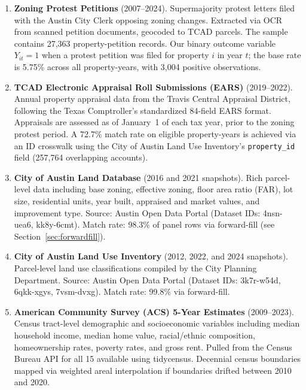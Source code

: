 \begin{enumerate}
    \item \textbf{Zoning Protest Petitions} (2007--2024). Supermajority protest letters filed
    with the Austin City Clerk opposing zoning changes.
    Extracted via OCR from scanned petition documents, geocoded to TCAD parcels.
    The sample contains 27,363 property-petition records. Our binary outcome variable
    $Y_{it} = 1$ when a protest petition was filed for property $i$ in year $t$; the
    base rate is 5.75\% across all property-years, with 3,004 positive observations.

    \item \textbf{TCAD Electronic Appraisal Roll Submissions (EARS)} (2019--2022).
    Annual property appraisal data from the Travis Central Appraisal District,
    following the Texas Comptroller's standardized 84-field EARS format.
    Appraisals are assessed as of January~1 of each tax year, prior to the zoning protest period.
    A 72.7\% match rate on eligible property-years is achieved via an ID crosswalk
    using the City of Austin Land Use Inventory's \texttt{property\_id} field
    (257,764 overlapping accounts).

    \item \textbf{City of Austin Land Database} (2016 and 2021 snapshots).
    Rich parcel-level data including base zoning, effective zoning, floor area ratio (FAR),
    lot size, residential units, year built, appraised and market values, and improvement type.
    Source: Austin Open Data Portal (Dataset IDs: 4nsn-uea6, kk8y-6cmt).
    Match rate: 98.3\% of panel rows via forward-fill (see Section~\ref{sec:forwardfill}).

    \item \textbf{City of Austin Land Use Inventory} (2012, 2022, and 2024 snapshots).
    Parcel-level land use classifications compiled by the City Planning Department.
    Source: Austin Open Data Portal (Dataset IDs: 3k7r-w54d, 6qkk-xgys, 7vsm-dvxg).
    Match rate: 99.8\% via forward-fill.

    \item \textbf{American Community Survey (ACS) 5-Year Estimates} (2009--2023).
    Census tract-level demographic and socioeconomic variables
    including median household income, median home value, racial/ethnic composition,
    homeownership rates, poverty rates, and gross rent.
    Pulled from the Census Bureau API for all 15 available using tidycensus. Decennial census boundaries mapped via weighted areal interpolation
    if boundaries drifted between 2010 and 2020.
\end{enumerate}

